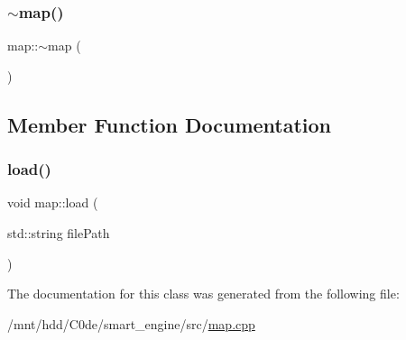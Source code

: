 \mbox{\label{classmap_a0cc22df7b44f7835fa10ed241848b041}} 
\subsubsection{\texorpdfstring{$\sim$map()}{~map()}}
{\footnotesize\ttfamily map\+::$\sim$map (\begin{DoxyParamCaption}{ }\end{DoxyParamCaption})\hspace{0.3cm}{\ttfamily [inline]}}



\subsection{Member Function Documentation}
\mbox{\label{classmap_a3edebf1c088adbb83a2e412accbe998e}} 
\subsubsection{\texorpdfstring{load()}{load()}}
{\footnotesize\ttfamily void map\+::load (\begin{DoxyParamCaption}\item[{std\+::string}]{file\+Path }\end{DoxyParamCaption})\hspace{0.3cm}{\ttfamily [inline]}}



The documentation for this class was generated from the following file\+:\begin{DoxyCompactItemize}
\item 
/mnt/hdd/\+C0de/smart\+\_\+engine/src/\hyperlink{map_8cpp}{map.\+cpp}\end{DoxyCompactItemize}
